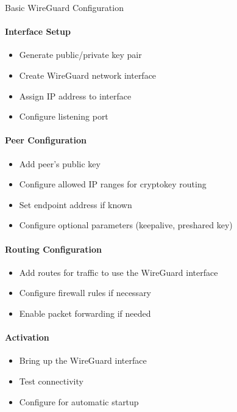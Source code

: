 \begin{KR}{Basic WireGuard Configuration}\\
\paragraph{Interface Setup}
\begin{itemize}
    \item Generate public/private key pair
    \item Create WireGuard network interface
    \item Assign IP address to interface
    \item Configure listening port
\end{itemize}

\paragraph{Peer Configuration}
\begin{itemize}
    \item Add peer's public key
    \item Configure allowed IP ranges for cryptokey routing
    \item Set endpoint address if known
    \item Configure optional parameters (keepalive, preshared key)
\end{itemize}

\paragraph{Routing Configuration}
\begin{itemize}
    \item Add routes for traffic to use the WireGuard interface
    \item Configure firewall rules if necessary
    \item Enable packet forwarding if needed
\end{itemize}

\paragraph{Activation}
\begin{itemize}
    \item Bring up the WireGuard interface
    \item Test connectivity
    \item Configure for automatic startup
\end{itemize}
\end{KR}

